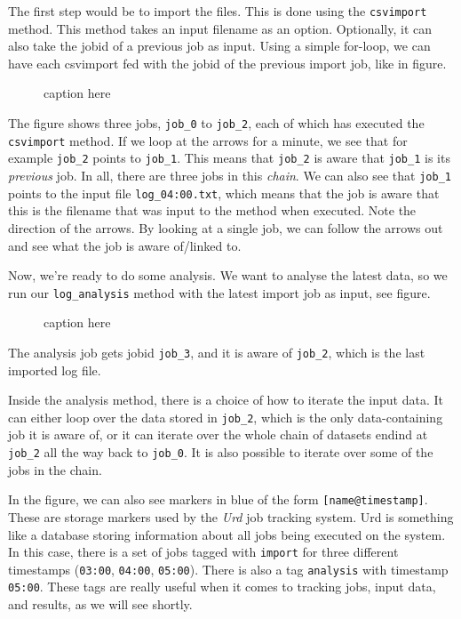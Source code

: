 \documentclass[a4paper]{article}
\begin{document}
\noindent The first step would be to import the files.  This is done
using the \texttt{csvimport} method.  This method takes an input
filename as an option.  Optionally, it can also take the jobid of a
previous job as input.  Using a simple for-loop, we can have each
csvimport fed with the jobid of the previous import job, like in
figure.
\begin{figure}[h!]
  \begin{center}
    
    \caption{caption here}
    \label{figure:example}
  \end{center}
\end{figure}
The figure shows three jobs, \texttt{job\_0} to \texttt{job\_2}, each
of which has executed the \texttt{csvimport} method.  If we loop at
the arrows for a minute, we see that for example \texttt{job\_2}
points to \texttt{job\_1}.  This means that \texttt{job\_2} is aware
that \texttt{job\_1} is its \textsl{previous} job.  In all, there are
three jobs in this \textsl{chain}.  We can also see that
\texttt{job\_1} points to the input file \texttt{log\_04:00.txt},
which means that the job is aware that this is the filename that was
input to the method when executed.  Note the direction of the arrows.
By looking at a single job, we can follow the arrows out and see what
the job is aware of/linked to.

Now, we're ready to do some analysis.  We want to analyse the latest
data, so we run our \texttt{log\_analysis} method with the latest
import job as input, see figure.
\begin{figure}[h!]
  \begin{center}
    
    \caption{caption here}
    \label{figure:example}
  \end{center}
\end{figure}
The analysis job gets jobid \texttt{job\_3}, and it is aware of
\texttt{job\_2}, which is the last imported log file.

Inside the analysis method, there is a choice of how to iterate the
input data.  It can either loop over the data stored in
\texttt{job\_2}, which is the only data-containing job it is aware of,
or it can iterate over the whole chain of datasets endind at
\texttt{job\_2} all the way back to \texttt{job\_0}.  It is also
possible to iterate over some of the jobs in the chain.

In the figure, we can also see markers in blue of the form
\texttt{[name@timestamp]}.  These are storage markers used by the
\textsl{Urd} job tracking system.  Urd is something like a database
storing information about all jobs being executed on the system.  In
this case, there is a set of jobs tagged with \texttt{import} for
three different timestamps (\texttt{03:00}, \texttt{04:00},
\texttt{05:00}).  There is also a tag \texttt{analysis} with timestamp
\texttt{05:00}.  These tags are really useful when it comes to
tracking jobs, input data, and results, as we will see shortly.
\end{document}
